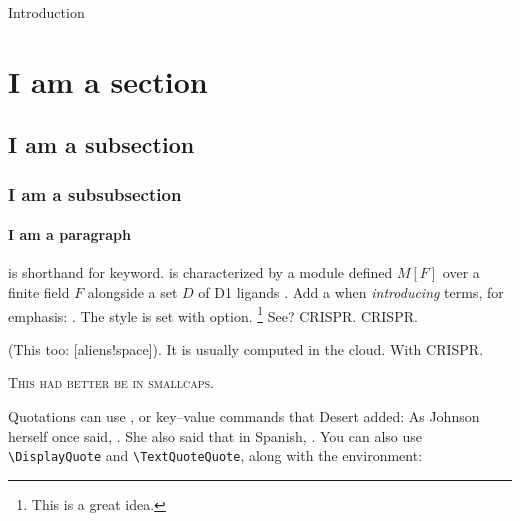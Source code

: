 
\begin{MainChapter}{Introduction}


\section{I am a section}

\subsection{I am a subsection}

\subsubsection{I am a subsubsection}

\paragraph*{I am a paragraph}  %
 is shorthand for keyword.
 is characterized by a module defined $M[F]$ over a finite field $F$ alongside a set $D$ of \ac{D1} ligands \cite{yolov6}.
Add a \code{*} when \emph{introducing} terms, for emphasis: .
The style is set with  option. \footnote{This is a great idea.} See? \ac{CRISPR}. \ac{CRISPR}.

(This too: [aliens!space]).
It is usually computed in the cloud. With \ac{CRISPR}.

\textsc{This had better be in smallcaps.}

Quotations can use , or key--value commands that Desert added:
As Johnson herself once said, .
She also said that in Spanish, .
You can also use \verb|\DisplayQuote| and \verb|\TextQuoteQuote|, along with the environment:






\end{MainChapter}
